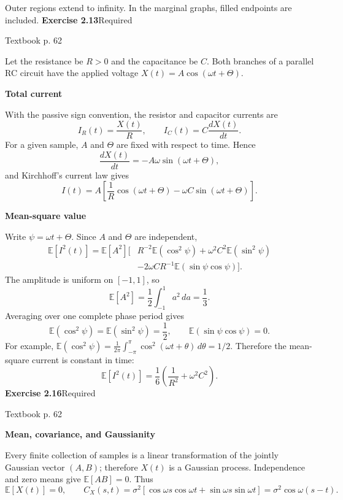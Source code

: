\documentclass[a4paper,11pt]{article}
\newcommand{\E}{\mathbb E}\newcommand{\Var}{\operatorname{Var}}\newcommand{\Cov}{\operatorname{Cov}}
\newcommand{\problem}[3]{{\LARGE\bfseries Exercise #1}\hfill #2\par{\small\color{gray}Textbook p. #3}\par\vspace{3mm}}
\newcommand{\step}[1]{\par\textbf{#1}\par}
\begin{document}
\begin{center}
\end{center}
Outer regions extend to infinity. In the marginal graphs, filled endpoints are included.
\newpage
\problem{2.13}{Required}{62}
Let the resistance be $R>0$ and the capacitance be $C$. Both branches of a parallel RC circuit have the applied voltage $X(t)=A\cos(\omega t+\Theta)$.
\step{Total current}
With the passive sign convention, the resistor and capacitor currents are
\[
I_R(t)=\frac{X(t)}R,\qquad I_C(t)=C\frac{dX(t)}{dt}.
\]
For a given sample, $A$ and $\Theta$ are fixed with respect to time. Hence
\[
\frac{dX(t)}{dt}=-A\omega\sin(\omega t+\Theta),
\]
and Kirchhoff's current law gives
\[
\boxed{I(t)=A\left[\frac1R\cos(\omega t+\Theta)-\omega C\sin(\omega t+\Theta)\right].}
\]
\step{Mean-square value}
Write $\psi=\omega t+\Theta$. Since $A$ and $\Theta$ are independent,
\begin{align*}
\E[I^2(t)]
=\E[A^2]\bigl[&R^{-2}\E(\cos^2\psi)+\omega^2C^2\E(\sin^2\psi)\\
&-2\omega C R^{-1}\E(\sin\psi\cos\psi)\bigr].
\end{align*}
The amplitude is uniform on $[-1,1]$, so
\[
\E[A^2]=\frac12\int_{-1}^1a^2\,da=\frac13.
\]
Averaging over one complete phase period gives
\[
\E(\cos^2\psi)=\E(\sin^2\psi)=\frac12,\qquad
\E(\sin\psi\cos\psi)=0.
\]
For example, $\E(\cos^2\psi)=\frac1{2\pi}\int_{-\pi}^{\pi}\cos^2(\omega t+\theta)\,d\theta=1/2$.
Therefore the mean-square current is constant in time:
\[
\boxed{\E[I^2(t)]=\frac16\left(\frac1{R^2}+\omega^2C^2\right).}
\]
\newpage
\problem{2.16}{Required}{62}
\step{Mean, covariance, and Gaussianity}
Every finite collection of samples is a linear transformation of the jointly Gaussian vector $(A,B)$; therefore $X(t)$ is a Gaussian process. Independence and zero means give $\E[AB]=0$. Thus
\[
\E[X(t)]=0,\qquad
C_X(s,t)=\sigma^2[\cos\omega s\cos\omega t+\sin\omega s\sin\omega t]
=\sigma^2\cos\omega(s-t).
\]
\end{document}
